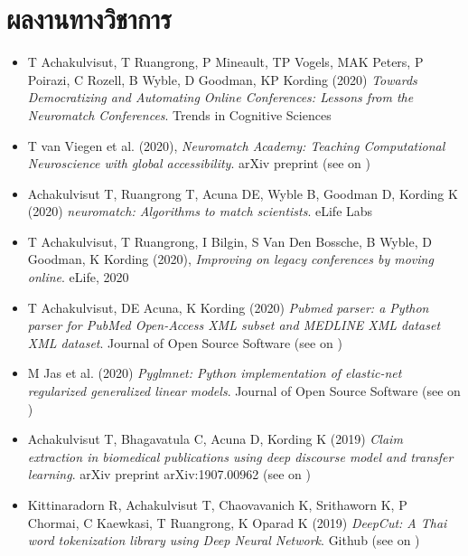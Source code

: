 \section{\sc ผลงานทางวิชาการ}

\begin{itemize}[leftmargin=0cm, label={}]

\item T Achakulvisut, T Ruangrong, P Mineault, TP Vogels, MAK Peters, P Poirazi, C Rozell, B Wyble, D Goodman, KP Kording (2020) {\em Towards Democratizing and Automating Online Conferences: Lessons from the Neuromatch Conferences}. Trends in Cognitive Sciences

\item T van Viegen et al. (2020), {\em Neuromatch Academy: Teaching Computational Neuroscience with global accessibility}. arXiv preprint (see on \href{https://github.com/NeuromatchAcademy/course-content}{\faGithubAlt})

\item Achakulvisut T, Ruangrong T, Acuna DE, Wyble B,  Goodman D, Kording K (2020) {\em neuromatch: Algorithms to match scientists}. eLife Labs

\item T Achakulvisut, T Ruangrong, I Bilgin, S Van Den Bossche, B Wyble, D Goodman, K Kording (2020), {\em Improving on legacy conferences by moving online}. eLife, 2020

\item T Achakulvisut, DE Acuna, K Kording (2020) {\em Pubmed parser: a Python parser for PubMed Open-Access XML subset and MEDLINE XML dataset XML dataset}. Journal of Open Source Software (see on \href{https://github.com/titipata/pubmed_parser}{\faGithubAlt})

\item M Jas et al. (2020) {\em Pyglmnet: Python implementation of elastic-net regularized generalized linear models}. Journal of Open Source Software (see on \href{https://github.com/glm-tools/pyglmnet}{\faGithubAlt})

\item Achakulvisut T, Bhagavatula C, Acuna D, Kording K (2019) {\em Claim extraction in biomedical publications using deep discourse model and transfer learning}. arXiv preprint arXiv:1907.00962 (see on \href{https://github.com/titipata/detecting-scientific-claim}{\faGithubAlt})

\item Kittinaradorn R, Achakulvisut T, Chaovavanich K, Srithaworn K, P Chormai, C Kaewkasi, T Ruangrong, K Oparad K (2019) {\em  DeepCut: A Thai word tokenization library using Deep Neural Network}. Github (see on \href{https://github.com/rkcosmos/deepcut}{\faGithubAlt})


\end{itemize}
